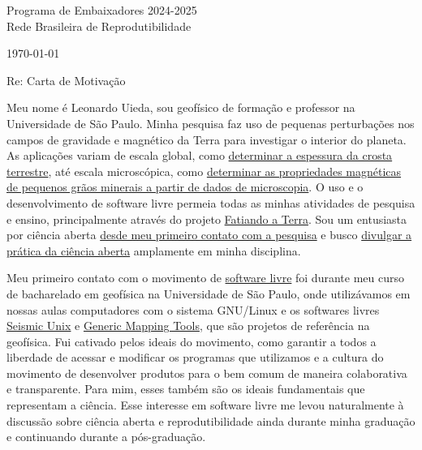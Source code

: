 \documentclass[a4paper,onecolumn,10pt]{article}
\newcommand{\Padding}{\vspace{0.5cm}}
\begin{document}
\begin{flushleft}
  Programa de Embaixadores 2024-2025
  \\
  Rede Brasileira de Reprodutibilidade
\end{flushleft}
\begin{flushright}
  \today
\end{flushright}
\Padding

\noindent
Re: Carta de Motivação
\Padding


Meu nome é Leonardo Uieda, sou geofísico de formação e professor na
Universidade de São Paulo.
Minha pesquisa faz uso de pequenas perturbações nos campos de gravidade e magnético da Terra para investigar o interior do planeta.
As aplicações variam de escala global, como \href{https://github.com/pinga-lab/paper-moho-inversion-tesseroids}{determinar a espessura da crosta terrestre},
até escala microscópica, como
\href{https://github.com/compgeolab/micromag-euler-dipole}{determinar as
propriedades magnéticas de pequenos grãos minerais a partir de dados de
microscopia}.
O uso e o desenvolvimento de software livre permeia todas as minhas atividades
de pesquisa e ensino, principalmente através do projeto
\href{https://www.fatiando.org/}{Fatiando a Terra}.
Sou um entusiasta por ciência aberta
\href{https://github.com/leouieda/agu2010}{desde meu primeiro contato com a pesquisa} e
busco
\href{https://meetingorganizer.copernicus.org/EGU21/session/40092}{divulgar a prática da ciência aberta} amplamente em minha disciplina.

Meu primeiro contato com o movimento de \href{https://www.fsf.org/}{software
livre} foi durante meu curso de bacharelado em geofísica na Universidade de São
Paulo,
onde utilizávamos em nossas aulas computadores com o sistema GNU/Linux e os
softwares livres
\href{https://en.wikipedia.org/wiki/Seismic_Unix}{Seismic Unix}
e \href{https://www.generic-mapping-tools.org/}{Generic Mapping Tools},
que são projetos de referência na geofísica.
Fui cativado pelos ideais do movimento, como garantir a todos a liberdade de
acessar e modificar os programas que utilizamos e a cultura do movimento de
desenvolver produtos para o bem comum de maneira colaborativa e transparente.
Para mim, esses também são os ideais fundamentais que representam a ciência.
Esse interesse em software livre me levou naturalmente à discussão sobre
ciência aberta e reprodutibilidade ainda durante minha graduação e continuando
durante a pós-graduação.
\end{document}
